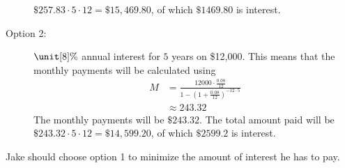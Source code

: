 \begin{problem}
\begin{subproblem}
\begin{shortsolution}
\begin{description}
				       $\$257.83\cdot 5\cdot 12=\$15,469.80$, of which $\$1469.80$ is interest.
				 \item[Option 2:] $\unit[8]{\%}$ annual interest for $5$ years on \$12,000.
				       This means that the monthly payments will be calculated using
				       \begin{align*}
					       M & = \frac{12000\cdot \frac{0.08}{12}}{1-\left( 1+\frac{0.08}{12} \right)^{-12\cdot 5}} \\
					         & \approx 243.32
				       \end{align*}
				       The monthly payments will be $\$243.32$. The total amount paid
				       will be $\$243.32\cdot 5\cdot 12 =\$14,599.20$, of which $\$2599.2$ is
				       interest.
			 \end{description}
			 Jake should choose option 1 to minimize the amount of interest
			 he has to pay.
		 \end{shortsolution}
	 \end{subproblem}
	 \end{problem}

